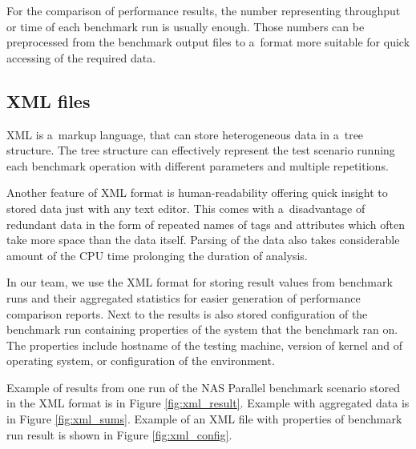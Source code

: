 For the comparison of performance results, the number representing throughput or
time of each benchmark run is usually enough. Those numbers can be preprocessed
from the benchmark output files to a~format more suitable for quick accessing
of the required data.

\subsection{XML files}
XML is a~markup language, that can store heterogeneous data in a~tree structure.
The tree structure can effectively represent the test scenario running each
benchmark operation with different parameters and multiple repetitions.

Another feature of XML format is human-readability offering quick insight to stored
data just with any text editor.
This comes with a~disadvantage of redundant data in the form of repeated names of
tags and attributes which often take more space than the data itself. Parsing of
the data also takes considerable amount of the CPU time prolonging the duration of
analysis.

In our team, we use the XML format for storing result values from benchmark runs
and their aggregated statistics for easier generation of performance comparison
reports. Next to the results is also stored configuration of the benchmark run
containing properties of the system that the benchmark ran on. The properties include
hostname of the testing machine, version of kernel and of operating system, or
configuration of the environment.

Example of results from one run of the NAS Parallel benchmark scenario stored in
the XML format is in Figure \ref{fig:xml_result}. Example with aggregated
data is in Figure \ref{fig:xml_sums}. Example of an XML file with properties
of benchmark run result is shown in Figure \ref{fig:xml_config}.

